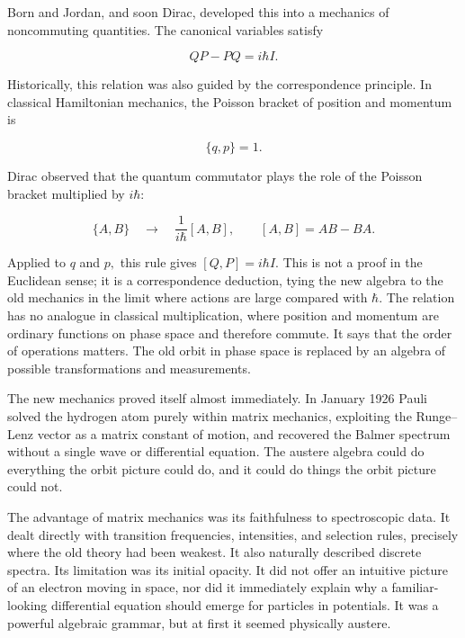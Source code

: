 Born and Jordan, and soon Dirac, developed this into a mechanics of noncommuting quantities. The canonical variables satisfy
\begin{linenomath}
    \begin{equation}
        QP-PQ=i\hbar I.
    \end{equation}
\end{linenomath}
Historically, this relation was also guided by the correspondence principle. In classical Hamiltonian mechanics, the Poisson bracket of position and momentum is
\begin{linenomath}
    \begin{equation}
        \{q,p\}=1.
    \end{equation}
\end{linenomath}
Dirac observed that the quantum commutator plays the role of the Poisson bracket multiplied by $i\hbar$:
\begin{linenomath}
    \begin{equation}
        \{A,B\}
        \quad\longrightarrow\quad
        \frac{1}{i\hbar}[A,B],
        \qquad
        [A,B]=AB-BA.
    \end{equation}
\end{linenomath}
Applied to $q$ and $p,$ this rule gives $[Q,P]=i\hbar I.$ This is not a proof in the Euclidean sense; it is a correspondence deduction, tying the new algebra to the old mechanics in the limit where actions are large compared with $\hbar.$ The relation has no analogue in classical multiplication, where position and momentum are ordinary functions on phase space and therefore commute. It says that the order of operations matters. The old orbit in phase space is replaced by an algebra of possible transformations and measurements.

The new mechanics proved itself almost immediately. In January 1926 Pauli solved the hydrogen atom purely within matrix mechanics, exploiting the Runge--Lenz vector as a matrix constant of motion, and recovered the Balmer spectrum without a single wave or differential equation. The austere algebra could do everything the orbit picture could do, and it could do things the orbit picture could not.

The advantage of matrix mechanics was its faithfulness to spectroscopic data. It dealt directly with transition frequencies, intensities, and selection rules, precisely where the old theory had been weakest. It also naturally described discrete spectra. Its limitation was its initial opacity. It did not offer an intuitive picture of an electron moving in space, nor did it immediately explain why a familiar-looking differential equation should emerge for particles in potentials. It was a powerful algebraic grammar, but at first it seemed physically austere.

